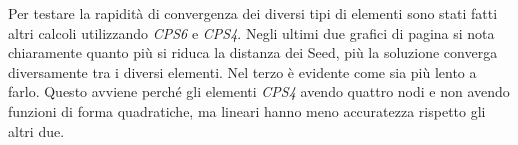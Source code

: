 Per testare la rapidità di convergenza dei diversi tipi di elementi sono stati fatti altri calcoli utilizzando \emph{CPS6} e \emph{CPS4}. 
Negli ultimi due grafici di pagina \pageref{GraficoConfronto} si nota chiaramente quanto più si riduca la distanza dei Seed, più la soluzione converga diversamente tra i diversi elementi. 
Nel terzo è evidente come sia più lento a farlo.
Questo avviene perché gli elementi \emph{CPS4} avendo quattro nodi e non avendo funzioni di forma quadratiche, ma lineari hanno meno accuratezza rispetto gli altri due.
%
\begin{figure}[p]
\centering
{} \\

\end{figure}
